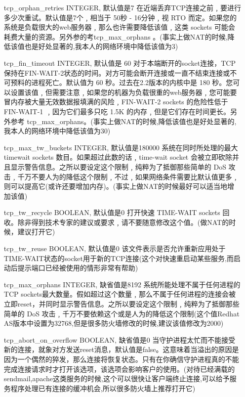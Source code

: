 \begin{enumerate}
\item[tcp\_orphan\_retries] INTEGER,
默认值是7
在近端丢弃TCP连接之前﹐要进行多少次重试。默认值是7个﹐相当于 50秒 - 16分钟﹐视 RTO 而定。如果您的系统是负载很大的web服务器﹐那么也许需要降低该值﹐这类 sockets 可能会耗费大量的资源。另外参的考tcp\_max\_orphans 。(事实上做NAT的时候,降低该值也是好处显著的,我本人的网络环境中降低该值为3)

\item[tcp\_fin\_timeout] INTEGER,
默认值是 60
对于本端断开的socket连接，TCP保持在FIN-WAIT-2状态的时间。对方可能会断开连接或一直不结束连接或不可预料的进程死亡。默认值为 60 秒。过去在2.2版本的内核中是 180 秒。您可以设置该值﹐但需要注意﹐如果您的机器为负载很重的web服务器﹐您可能要冒内存被大量无效数据报填满的风险﹐FIN-WAIT-2 sockets 的危险性低于 FIN-WAIT-1 ﹐因为它们最多只吃 1.5K 的内存﹐但是它们存在时间更长。另外参考 tcp\_max\_orphans。(事实上做NAT的时候,降低该值也是好处显著的,我本人的网络环境中降低该值为30)

\item[tcp\_max\_tw\_buckets] INTEGER,
默认值是180000
系统在同时所处理的最大 timewait sockets 数目。如果超过此数的话﹐time-wait socket 会被立即砍除并且显示警告信息。之所以要设定这个限制﹐纯粹为了抵御那些简单的 DoS 攻击﹐千万不要人为的降低这个限制﹐不过﹐如果网络条件需要比默认值更多﹐则可以提高它(或许还要增加内存)。(事实上做NAT的时候最好可以适当地增加该值)

\item[tcp\_tw\_recycle] BOOLEAN,
默认值是0
打开快速 TIME-WAIT sockets 回收。除非得到技术专家的建议或要求﹐请不要随意修改这个值。(做NAT的时候，建议打开它)

\item[tcp\_tw\_reuse] BOOLEAN,
默认值是0
该文件表示是否允许重新应用处于TIME-WAIT状态的socket用于新的TCP连接(这个对快速重启动某些服务,而启动后提示端口已经被使用的情形非常有帮助)

\item[tcp\_max\_orphans] INTEGER,
缺省值是8192
系统所能处理不属于任何进程的TCP sockets最大数量。假如超过这个数量﹐那么不属于任何进程的连接会被立即reset，并同时显示警告信息。之所以要设定这个限制﹐纯粹为了抵御那些简单的 DoS 攻击﹐千万不要依赖这个或是人为的降低这个限制(这个值Redhat AS版本中设置为32768,但是很多防火墙修改的时候,建议该值修改为2000)

\item[tcp\_abort\_on\_overflow] BOOLEAN,
缺省值是0
当守护进程太忙而不能接受新的连接，就象对方发送reset消息，默认值是false。这意味着当溢出的原因是因为一个偶然的猝发，那么连接将恢复状态。只有在你确信守护进程真的不能完成连接请求时才打开该选项，该选项会影响客户的使用。(对待已经满载的sendmail,apache这类服务的时候,这个可以很快让客户端终止连接,可以给予服务程序处理已有连接的缓冲机会,所以很多防火墙上推荐打开它)


\end{enumerate}
